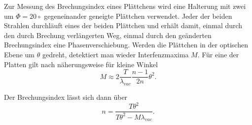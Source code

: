 Zur Messung des Brechungsindex eines Plättchens wird eine Halterung mit zwei um $\Phi = 20\circ$ gegeneinander geneigte Plättchen verwendet. Jeder der beiden Strahlen durchläuft eines der beiden Plättchen und erhält damit, einmal durch den durch Brechung verlängerten Weg, einmal durch den geänderten Brechungsindex eine Phasenverschiebung. Werden die Plättchen in der optischen Ebene um $\theta$ gedreht, detektiert man wieder Interfenzmaxima $M$.
Für eine der Platten gilt nach \cite{Anleitung} näherungsweise für kleine Winkel
\begin{equation}
	M \approx 2 \frac{T}{\lambda_{vac}} \frac{n-1}{2n} \theta^2.
  \label{eq:fringes}
\end{equation}

Der Brechungsindex lässt sich dann über
\begin{equation}
   \label{eq:index}
	n = \frac{T \theta^2}{T \theta^2-M \lambda_{vac}}.
\end{equation}
